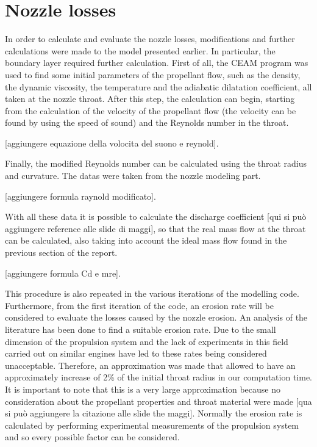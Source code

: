 \section{Nozzle losses}
\label{sec:nozzle_losses}

In order to calculate and evaluate the nozzle losses, modifications and further calculations were made to the model presented earlier. In particular, the boundary layer required further calculation. First of all, the CEAM program was used to find some initial parameters of the propellant flow, such as the density, the dynamic viscosity, the temperature and the adiabatic dilatation coefficient, all taken at the nozzle throat. After this step, the calculation can begin, starting from the calculation of the velocity of the propellant flow (the velocity can be found by using the speed of sound) and the Reynolds number in the throat.


[aggiungere equazione della volocita del suono e reynold].    


Finally, the modified Reynolds number can be calculated using the throat radius and curvature. The datas were taken from the nozzle modeling part.  


[aggiungere formula raynold modificato].  


With all these data it is possible to calculate the discharge coefficient [qui si può aggiungere reference alle slide di maggi], so that the real mass flow at the throat can be calculated, also taking into account the ideal mass flow found in the previous section of the report.   


[aggiungere formula Cd e mre].   


This procedure is also repeated in the various iterations of the modelling code. Furthermore, from the first iteration of the code, an erosion rate will be considered to evaluate the losses caused by the nozzle erosion. An analysis of the literature has been done to find a suitable erosion rate. Due to the small dimension of the propulsion system and the lack of experiments in this field carried out on similar engines have led to these rates being considered unacceptable. Therefore, an approximation was made that allowed to have an approximately increase of 2\% of the initial throat radius in our computation time. It is important to note that this is a very large approximation because no consideration about the propellant properties and throat material were made [qua si può aggiungere la citazione alle slide the maggi]. Normally the erosion rate is calculated by performing experimental measurements of the propulsion system and so every possible factor can be considered. 
